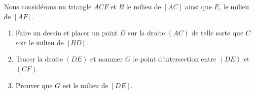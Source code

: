 
\begin{exercice}\label{exosmath-1000}

    Nous considérons un triangle \( ACF\) et \( B\) le milieu de \( [AC]\) ainsi que \( E\), le milieu de \( [AF]\).
    \begin{enumerate}
        \item
            Faire un dessin et placer un point \( D\) sur la droite \( (AC)\) de telle sorte que \( C\) soit le milieu de \( [BD]\).
        \item
            Tracer la droite \( (DE)\) et nommer \( G\) le point d'intersection entre \( (DE)\) et \( (CF)\).
        \item
            Prouver que \( G\) est le milieu de \( [DE]\).
    \end{enumerate}

\end{exercice}
